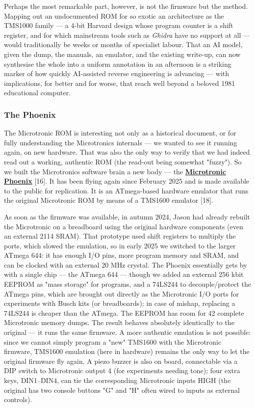 \documentclass[
  11pt,
  letterpaper,
]{article}
\begin{document}
Perhaps the most remarkable part, however, is not the firmware but the
method. Mapping out an undocumented ROM for so exotic an architecture as
the TMS1000 family --- a 4-bit Harvard design whose program counter is a
shift register, and for which mainstream tools such as \emph{Ghidra}
have no support at all --- would traditionally be weeks or months of
specialist labour. That an AI model, given the dump, the manuals, an
emulator, and the existing write-up, can now synthesise the whole into a
uniform annotation in an afternoon is a striking marker of how quickly
AI-assisted reverse engineering is advancing --- with implications, for
better and for worse, that reach well beyond a beloved 1981 educational
computer.

\subsubsection{The Phoenix}\label{the-phoenix}

The Microtronic ROM is interesting not only as a historical document, or
for fully understanding the Microtronic\textquotesingle s internals ---
we wanted to see it running again, on new hardware. That was also the
only way to verify that we had indeed read out a working, authentic ROM
(the read-out being somewhat "fuzzy"). So we built the
Microtronic\textquotesingle s software brain a new body --- the
\href{https://github.com/lambdamikel/microtronic-phoenix}{\textbf{Microtronic
Phoenix}} {[}16{]}. It has been flying again since February 2025 and is
made available to the public for replication. It is an ATmega-based
hardware emulator that runs the original Microtronic ROM by means of a
TMS1600 emulator {[}18{]}.

As soon as the firmware was available, in autumn 2024, Jason had already
rebuilt the Microtronic on a breadboard using the original hardware
components (even an external 2114 SRAM). That prototype used shift
registers to multiply the ports, which slowed the emulation, so in early
2025 we switched to the larger ATmega 644: it has enough I/O pins, more
program memory and SRAM, and can be clocked with an external 20 MHz
crystal. The Phoenix essentially gets by with a single chip --- the
ATmega 644 --- though we added an external 256 kbit EEPROM as "mass
storage" for programs, and a 74LS244 to decouple/protect the ATmega
pins, which are brought out directly as the Microtronic I/O ports for
experiments with Busch kits (or breadboards); in case of mishap,
replacing a 74LS244 is cheaper than the ATmega. The EEPROM has room for
42 complete Microtronic memory dumps. The result behaves absolutely
identically to the original --- it runs the same firmware. A more
authentic emulation is not possible: since we cannot simply program a
"new" TMS1600 with the Microtronic firmware, TMS1600 emulation (here in
hardware) remains the only way to let the original firmware fly again. A
piezo buzzer is also on board, connectable via a DIP switch to
Microtronic output 4 (for experiments needing tone); four extra keys,
DIN1--DIN4, can tie the corresponding Microtronic inputs HIGH (the
original has two console buttons "G" and "H" often wired to inputs as
external controls).
\end{document}
